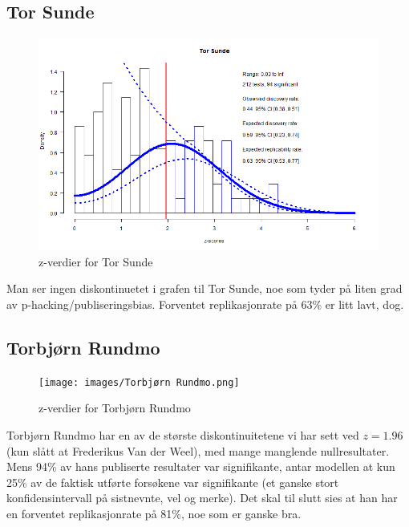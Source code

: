 \documentclass[doc,norsk]{apa7}
\begin{document}
\subsection{Tor Sunde}
\begin{figure}[h!]
    \centering
    \includegraphics[width=\textwidth]{images/Tor Sunde.png}
    \caption{z-verdier for Tor Sunde}
\end{figure}
Man ser ingen diskontinuetet i grafen til Tor Sunde, noe som tyder på liten grad av p-hacking/publiseringsbias. Forventet replikasjonrate på $63\%$ er litt lavt, dog.

\subsection{Torbjørn Rundmo}
\begin{figure}[h!]
    \centering
    \texttt{[image: images/Torbjørn Rundmo.png]}
    \caption{z-verdier for Torbjørn Rundmo}
\end{figure}
Torbjørn Rundmo har en av de største diskontinuitetene vi har sett ved $z=1.96$ (kun slått at Frederikus Van der Weel), med mange manglende nullresultater. Mens 94\% av hans publiserte resultater var signifikante, antar modellen at kun 25\% av de faktisk utførte forsøkene var signifikante (et ganske stort konfidensintervall på sistnevnte, vel og merke). Det skal til slutt sies at han har en forventet replikasjonrate på 81\%, noe som er ganske bra.
\end{document}
